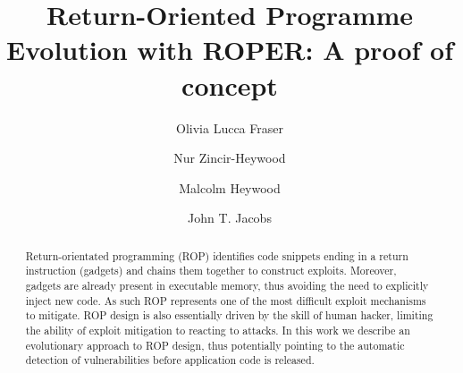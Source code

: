 \documentclass[sigconf]{acmart}
\begin{document}
\title{Return-Oriented Programme Evolution with ROPER: A proof of concept}


\author{Olivia Lucca Fraser}

\author{Nur Zincir-Heywood}

\author{Malcolm Heywood}

\author{John T. Jacobs}


\renewcommand{\shortauthors}{O. Fraser et al.}
\renewcommand{\shorttitle}{Return-Oriented Programme Evolution with ROPER}


\begin{abstract}
Return-orientated programming (ROP) identifies code snippets ending in a return instruction (gadgets) and chains them together to construct exploits. Moreover, gadgets are already present in executable memory, thus avoiding the need to explicitly inject new code. As such ROP represents one of the most difficult exploit mechanisms to mitigate. ROP design is also essentially driven by the skill of human hacker, limiting the ability of exploit mitigation to reacting to attacks. In this work we describe an evolutionary approach to ROP design, thus potentially pointing to the automatic detection of vulnerabilities before application code is released.
\end{abstract}
\end{document}
